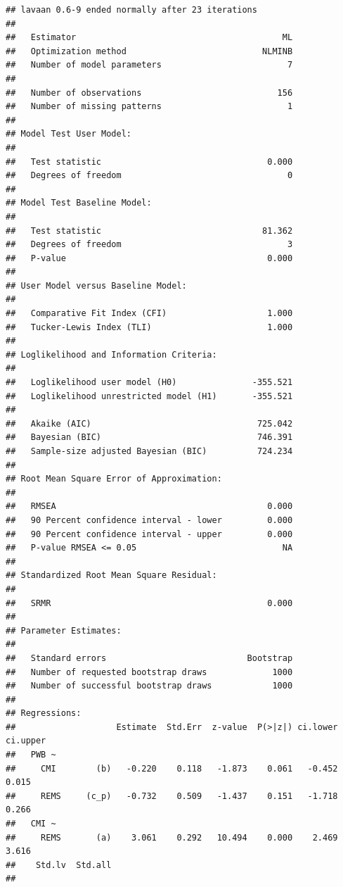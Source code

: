 \documentclass[
  11pt,
]{book}
\begin{document}
\begin{verbatim}
## lavaan 0.6-9 ended normally after 23 iterations
## 
##   Estimator                                         ML
##   Optimization method                           NLMINB
##   Number of model parameters                         7
##                                                       
##   Number of observations                           156
##   Number of missing patterns                         1
##                                                       
## Model Test User Model:
##                                                       
##   Test statistic                                 0.000
##   Degrees of freedom                                 0
## 
## Model Test Baseline Model:
## 
##   Test statistic                                81.362
##   Degrees of freedom                                 3
##   P-value                                        0.000
## 
## User Model versus Baseline Model:
## 
##   Comparative Fit Index (CFI)                    1.000
##   Tucker-Lewis Index (TLI)                       1.000
## 
## Loglikelihood and Information Criteria:
## 
##   Loglikelihood user model (H0)               -355.521
##   Loglikelihood unrestricted model (H1)       -355.521
##                                                       
##   Akaike (AIC)                                 725.042
##   Bayesian (BIC)                               746.391
##   Sample-size adjusted Bayesian (BIC)          724.234
## 
## Root Mean Square Error of Approximation:
## 
##   RMSEA                                          0.000
##   90 Percent confidence interval - lower         0.000
##   90 Percent confidence interval - upper         0.000
##   P-value RMSEA <= 0.05                             NA
## 
## Standardized Root Mean Square Residual:
## 
##   SRMR                                           0.000
## 
## Parameter Estimates:
## 
##   Standard errors                            Bootstrap
##   Number of requested bootstrap draws             1000
##   Number of successful bootstrap draws            1000
## 
## Regressions:
##                    Estimate  Std.Err  z-value  P(>|z|) ci.lower ci.upper
##   PWB ~                                                                 
##     CMI        (b)   -0.220    0.118   -1.873    0.061   -0.452    0.015
##     REMS     (c_p)   -0.732    0.509   -1.437    0.151   -1.718    0.266
##   CMI ~                                                                 
##     REMS       (a)    3.061    0.292   10.494    0.000    2.469    3.616
##    Std.lv  Std.all
##                   

\end{verbatim}
\end{document}
